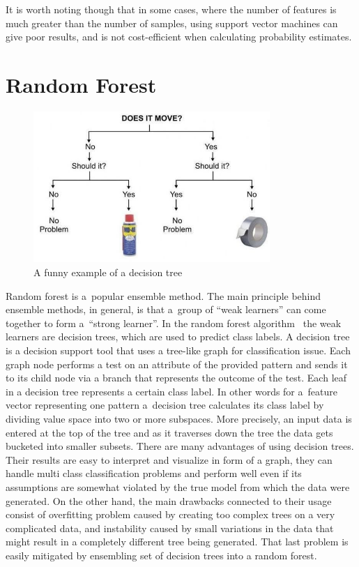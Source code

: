 It is worth noting though that in some cases, where the number of features is much greater than the number of samples, using support vector machines can give poor results, and is not cost-efficient when calculating probability estimates. 

\section{Random Forest}

\begin{figure}[htp]
	\centering
	\includegraphics[width=0.8\textwidth]{Figures/rf_visualization_funny.jpg}
	\caption{A funny example of a decision tree}
	\label{fig:rf_visualization_funny}\vspace{-3pt}
\end{figure}

Random forest is a~popular ensemble method. The main principle behind ensemble methods, in general, is that a~group of ``weak learners'' can come together to form a~``strong learner''. In the random forest algorithm~\cite{Breiman2001} the weak learners are decision trees, which are used to predict class labels. A decision tree is a decision support tool that uses a tree-like graph for classification issue. Each graph node performs a test on an attribute of the provided pattern and sends it to its child node via a branch that represents the outcome of the test. Each leaf in a decision tree represents a certain class label. In other words for a~feature vector representing one pattern a~decision tree calculates its class label by dividing value space into two or more subspaces. More precisely, an input data is entered at the top of the tree and as it traverses down the tree the data gets bucketed into smaller subsets. There are many advantages of using decision trees. Their results are easy to interpret and visualize in form of a graph, they can handle multi class classification problems and perform well even if its assumptions are somewhat violated by the true model from which the data were generated. On the other hand, the main drawbacks connected to their usage consist of overfitting problem caused by creating too complex trees on a very complicated data, and instability caused by small variations in the data that might result in a completely different tree being generated. That last problem is easily mitigated by ensembling set of decision trees into a random forest. 

